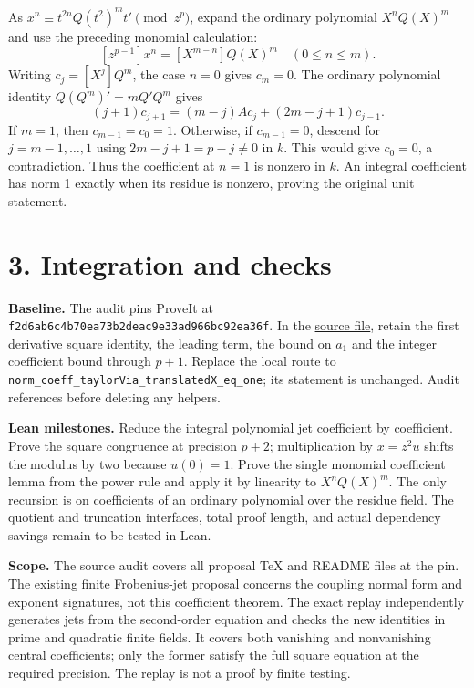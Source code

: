 \documentclass[11pt]{article}
\begin{document}
As \(x^n\equiv t^{2n}Q(t^2)^mt'\pmod{z^p}\), expand the ordinary
polynomial \(X^n Q(X)^m\) and use the preceding monomial calculation:
\[
 [z^{p-1}]x^n=[X^{m-n}]Q(X)^m\quad(0\le n\le m).
\]
Writing \(c_j=[X^j]Q^m\), the case \(n=0\) gives \(c_m=0\).
The ordinary polynomial identity \(Q(Q^m)'=mQ'Q^m\) gives
\[
 (j+1)c_{j+1}=(m-j)Ac_j+(2m-j+1)c_{j-1}.
\]
If \(m=1\), then \(c_{m-1}=c_0=1\). Otherwise, if \(c_{m-1}=0\),
descend for \(j=m-1,\ldots,1\) using \(2m-j+1=p-j\ne0\) in \(k\).
This would give \(c_0=0\), a contradiction. Thus the coefficient at
\(n=1\) is nonzero in \(k\). An integral coefficient has norm 1
exactly when its residue is nonzero, proving the original unit statement.

\section*{3. Integration and checks}
\textbf{Baseline.}
The audit pins ProveIt at \texttt{f2d6ab6c4b70ea73b2deac9e33ad966bc92ea36f}.
In the
\href{https://github.com/VladimirReshetnikov/ProveIt/blob/f2d6ab6c4b70ea73b2deac9e33ad966bc92ea36f/Analysis/GeneralizedRiemannHypothesis/Lean/grh/src/New/Derivatives/FormalGroup/FrobeniusCongruence.lean#L301}{source file},
retain the first derivative square identity, the leading term, the
bound on \(a_1\) and the integer coefficient bound through \(p+1\).
Replace the local route to \texttt{norm\_coeff\_taylorVia\_translatedX\_eq\_one};
its statement is unchanged. Audit references before deleting any helpers.

\smallskip\noindent\textbf{Lean milestones.}
Reduce the integral polynomial jet coefficient by coefficient. Prove the
square congruence at precision \(p+2\); multiplication by \(x=z^2u\)
shifts the modulus by two because \(u(0)=1\). Prove the single monomial
coefficient lemma from the power rule and apply it by linearity to
\(X^nQ(X)^m\). The only recursion is on coefficients of an ordinary
polynomial over the residue field. The quotient and truncation
interfaces, total proof length, and actual dependency savings remain
to be tested in Lean.

\smallskip\noindent\textbf{Scope.}
The source audit covers all proposal TeX and README files at the pin.
The existing finite Frobenius-jet proposal concerns the coupling normal
form and exponent signatures, not this coefficient theorem. The exact
replay independently generates jets from the second-order equation
and checks the new identities in prime and quadratic finite fields.
It covers both vanishing and nonvanishing central coefficients;
only the former satisfy the full square equation at the required
precision. The replay is not a proof by finite testing.
\end{document}
